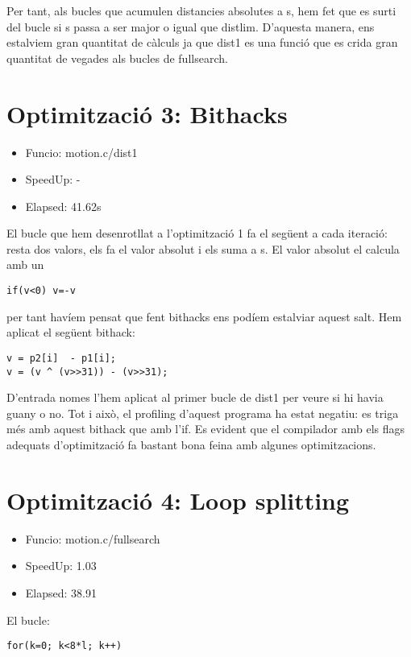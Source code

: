 Per tant, als bucles que acumulen distancies absolutes a s, hem fet que es surti del bucle si s passa a ser major o igual que distlim. D'aquesta manera, ens estalviem gran quantitat de càlculs ja que dist1 es una funció que es crida gran quantitat de vegades als bucles de fullsearch.


\section{Optimitzaci\'o 3: Bithacks}
\begin{itemize}
\item{Funcio: motion.c/dist1}
\item{SpeedUp: -}
\item{Elapsed: 41.62s}
\end{itemize}

El bucle que hem desenrotllat a l'optimització 1 fa el següent a cada iteració: resta dos valors, els fa el valor absolut i els suma a s. El valor absolut el calcula amb un 

\begin{lstlisting}
if(v<0) v=-v 
\end{lstlisting}

per tant havíem pensat que fent bithacks ens podíem estalviar aquest salt. Hem aplicat el següent bithack:

\begin{lstlisting}
v = p2[i]  - p1[i];
v = (v ^ (v>>31)) - (v>>31);
\end{lstlisting}
 

D'entrada nomes l'hem aplicat al primer bucle de dist1 per veure si hi havia guany o no. Tot i això, el profiling d'aquest programa ha estat negatiu: es triga més amb aquest bithack que amb l'if. Es evident que el compilador amb els flags adequats d'optimització fa bastant bona feina amb algunes optimitzacions.
              

\section{Optimitzaci\'o 4: Loop splitting}
\begin{itemize}
\item{Funcio: motion.c/fullsearch}
\item{SpeedUp: 1.03}
\item {Elapsed: 38.91}
\end{itemize}

El bucle:

\begin{lstlisting}
for(k=0; k<8*l; k++)
\end{lstlisting}

